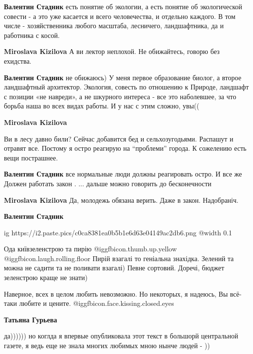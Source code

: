 \begin{itemize}
\begin{itemize}
\begin{itemize}
\textbf{Валентин Стадник} есть понятие об экологии, а есть понятие об экологической совести - а это уже касается и всего человечества, и отдельно каждого. В том числе - хозяйственника любого масштаба, лесничего, ландшафтника, да и работника с косой.

\textbf{Miroslava Kizilova} А ви лектор неплохой. Не обижайтесь, говорю без ехидства.

\textbf{Валентин Стадник} не обижаюсь)
У меня первое образование биолог, а второе ландшафтный архитектор. Экология, совесть по отношению к Природе, ландшафт с позиции «не навреди», а не шкурного интереса - все это наболевшее, за что борьба наша во всех видах работы. И у нас с этим сложно, увы((

\textbf{Miroslava Kizilova} 

Ви в лесу давно били? Сейчас добавится бед и сельхозугодьями. Распашут и отравят
все. Поєтому я остро реагирую на \enquote{проблеми} города. К сожелению есть вещи
пострашнее.


\textbf{Валентин Стадник} все нормальные люди должны реагировать остро. И все же Должен работать закон . ... дальше можно говорить до бесконечности

\textbf{Miroslava Kizilova} Да, молодежь обязана верить. Даже в закон. Надобраніч.

\textbf{Валентин Стадник}

\ifcmt
  ig https://i2.paste.pics/c0ca8381ea0b5b1e6d63e04149ac2db6.png
  @width 0.1
\fi

\end{itemize} %

\end{itemize} %

Ода київзеленстрою та пирію  @igg{fbicon.thumb.up.yellow}  @igg{fbicon.laugh.rolling.floor} 
Пирій взагалі то геніальна знахідка. Зелений та можна не садити та не поливати взагалі)
Певне сортовий.
Доречі, бюджет зеленстрою краще не знати)

Наверное, всех в целом любить невозможно. Но некоторых, я надеюсь, Вы всё-таки
любите и цените. @igg{fbicon.face.kissing.closed.eyes} 

\begin{itemize} %
\textbf{Татьяна Гурьева} 

да)))))) но коглда я впервые опубликовала этот текст в большорй центральной
газете, я ведь еще не знала многих любимых мною нынче людей - ))



\end{itemize}
\end{itemize}
